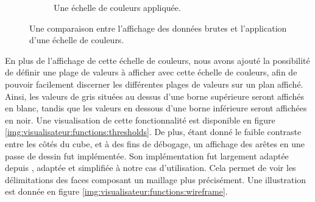 {{{\begin{figure}[h]
\begin{subfigure}{.45\linewidth}
                    \captionsetup{width=.9\linewidth}
                    \caption{Une échelle de couleurs appliquée.}
                    \label{img:visualisateur:color_scale_comparaison:colored}
                \end{subfigure}
                \captionsetup{width=.8\linewidth}
                \caption{Une comparaison entre l'affichage des données brutes et l'application d'une échelle de couleurs.}
                \label{img:visualisateur:color_scale_comparaison}
            \end{figure}

            En plus de l'affichage de cette échelle de couleurs, nous avons ajouté la possibilité de définir une plage de valeurs à afficher avec cette échelle de couleurs, afin de pouvoir facilement discerner les différentes plages de valeurs sur un plan affiché. Ainsi, les valeurs de gris situées au dessus d'une borne supérieure seront affichés en blanc, tandis que les valeurs en dessous d'une borne inférieure seront affichées en noir. Une visualisation de cette fonctionnalité est disponible en figure \ref{img:visualisateur:functions:thresholds}. De plus, étant donné le faible contraste entre les côtés du cube, et à des fins de débogage, un affichage des arêtes en une passe de dessin fut implémentée. Son implémentation fut largement adaptée depuis \cite{cite_wireframe}, adaptée et simplifiée à notre cas d'utilisation. Cela permet de voir les délimitations des faces composant un maillage plus précisément. Une illustration est donnée en figure \ref{img:visualisateur:functions:wireframe}.

}}}
